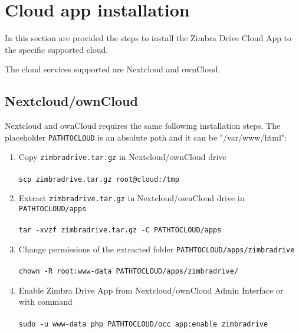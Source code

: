 \section{Cloud app installation}

In this section are provided the steps to install the Zimbra Drive Cloud App to the specific supported cloud.
\begin{warning}
The cloud services supported are Nextcloud and ownCloud.
\end{warning}

\subsection{Nextcloud/ownCloud}\label{subsec:NextcloudownCloudInstallation}
    Nextcloud and ownCloud requires the same following installation steps.
    The placeholder \texttt{PATH\textunderscore TO\textunderscore CLOUD} is an absolute path and it can be "/var/www/html":

    \begin{enumerate}
        \item Copy \texttt{zimbradrive.tar.gz} in Nextcloud/ownCloud drive\\ \\
        \texttt{scp zimbradrive.tar.gz root@cloud:/tmp}\\
        \item Extract \texttt{zimbradrive.tar.gz} in Nextcloud/ownCloud drive in \texttt{PATH\textunderscore TO\textunderscore CLOUD/apps}\\ \\
        \texttt{tar -xvzf zimbradrive.tar.gz -C \texttt{PATH\textunderscore TO\textunderscore CLOUD}/apps}\\
        \item Change permissions of the extracted folder \texttt{PATH\textunderscore TO\textunderscore CLOUD/apps/zimbradrive}\\ \\
        \texttt{chown -R root:www-data PATH\textunderscore TO\textunderscore CLOUD/apps/zimbradrive/}\\
        \item Enable Zimbra Drive App from Nextcloud/ownCloud Admin Interface or with command %
        \\ \\
        \texttt{sudo -u www-data php PATH\textunderscore TO\textunderscore CLOUD/occ app:enable zimbradrive}
    \end{enumerate}

